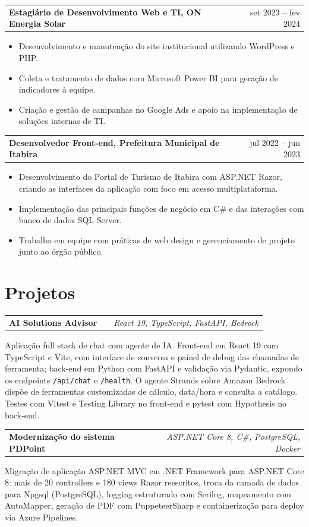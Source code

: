 \documentclass[a4paper,11pt]{article}
\makeatletter
\newenvironment{jobshort}[2]
    {
    \begin{tabularx}{\linewidth}{@{}l X r@{}}
    \textbf{#1} & \hfill &  #2 \\[3.75pt]
    \end{tabularx}
    }
    {
    }
\newenvironment{joblong}[2]
    {
    \begin{tabularx}{\linewidth}{@{}l X r@{}}
    \textbf{#1} & \hfill &  #2 \\[3.75pt]
    \end{tabularx}
    \begin{minipage}[t]{\linewidth}
    \begin{itemize}[nosep,after=\strut, leftmargin=1em, itemsep=3pt,label=--]
    }
    {
    \end{itemize}
    \end{minipage}
    }
\makeatother
\begin{document}
\begin{joblong}{Estagiário de Desenvolvimento Web e TI, ON Energia Solar}{set 2023 -- fev 2024}
\item Desenvolvimento e manutenção do site institucional utilizando WordPress e PHP.
\item Coleta e tratamento de dados com Microsoft Power BI para geração de indicadores à equipe.
\item Criação e gestão de campanhas no Google Ads e apoio na implementação de soluções internas de TI.
\end{joblong}

\begin{joblong}{Desenvolvedor Front-end, Prefeitura Municipal de Itabira}{jul 2022 -- jun 2023}
\item Desenvolvimento do Portal de Turismo de Itabira com ASP.NET Razor, criando as interfaces da aplicação com foco em acesso multiplataforma.
\item Implementação das principais funções de negócio em C\# e das interações com banco de dados SQL Server.
\item Trabalho em equipe com práticas de web design e gerenciamento de projeto junto ao órgão público.
\end{joblong}

\section{Projetos}

\begin{jobshort}{AI Solutions Advisor}{\textit{React 19, TypeScript, FastAPI, Bedrock}}
Aplicação full stack de chat com agente de IA. Front-end em React 19 com TypeScript e Vite, com interface de conversa e painel de debug das chamadas de ferramenta; back-end em Python com FastAPI e validação via Pydantic, expondo os endpoints \texttt{/api/chat} e \texttt{/health}. O agente Strands sobre Amazon Bedrock dispõe de ferramentas customizadas de cálculo, data/hora e consulta a catálogo. Testes com Vitest e Testing Library no front-end e pytest com Hypothesis no back-end.
\end{jobshort}

\begin{jobshort}{Modernização do sistema PDPoint}{\textit{ASP.NET Core 8, C\#, PostgreSQL, Docker}}
Migração de aplicação ASP.NET MVC em .NET Framework para ASP.NET Core 8: mais de 20 controllers e 180 views Razor reescritos, troca da camada de dados para Npgsql (PostgreSQL), logging estruturado com Serilog, mapeamento com AutoMapper, geração de PDF com PuppeteerSharp e containerização para deploy via Azure Pipelines.
\end{jobshort}
\end{document}
